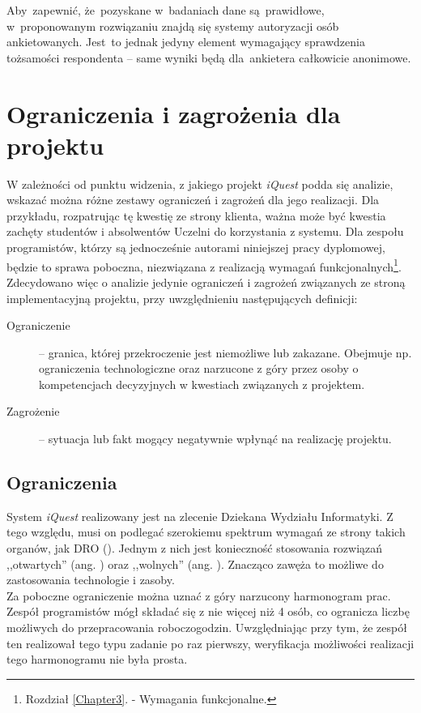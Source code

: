 Aby~zapewnić, że~pozyskane w~badaniach dane są~prawidłowe, w~proponowanym rozwiązaniu znajdą się systemy autoryzacji osób ankietowanych. Jest~to jednak jedyny element wymagający sprawdzenia tożsamości respondenta -- same wyniki będą dla~ankietera całkowicie anonimowe.

\section{Ograniczenia i zagrożenia dla projektu}
\label{Chapter12}

W zależności od punktu widzenia, z jakiego projekt \textit{iQuest} podda się analizie, wskazać można różne zestawy ograniczeń i zagrożeń dla jego realizacji. Dla przykładu, rozpatrując tę kwestię ze strony klienta, ważna może być kwestia zachęty studentów i absolwentów Uczelni do korzystania z systemu. Dla zespołu programistów, którzy są jednocześnie autorami niniejszej pracy dyplomowej, będzie to sprawa poboczna, niezwiązana z realizacją wymagań funkcjonalnych\footnote{Rozdział \ref{Chapter3}. - Wymagania funkcjonalne.}. Zdecydowano więc o analizie jedynie ograniczeń i zagrożeń związanych ze stroną implementacyjną projektu, przy uwzględnieniu następujących definicji:
\begin{description}
\item[Ograniczenie] -- granica, której przekroczenie jest niemożliwe lub zakazane. Obejmuje np. ograniczenia technologiczne oraz narzucone z góry przez osoby o kompetencjach decyzyjnych w kwestiach związanych z projektem.
\item[Zagrożenie] -- sytuacja lub fakt mogący negatywnie wpłynąć na realizację projektu.
\end{description}

\subsection{Ograniczenia}
\label{Chapter121}

System \textit{iQuest} realizowany jest na zlecenie Dziekana Wydziału Informatyki. Z tego względu, musi on podlegać szerokiemu spektrum wymagań ze strony takich organów, jak DRO (). Jednym z nich jest konieczność stosowania rozwiązań ,,otwartych'' (ang. ) oraz ,,wolnych'' (ang. ). Znacząco zawęża to możliwe do zastosowania technologie i zasoby. \\

Za poboczne ograniczenie można uznać z góry narzucony harmonogram prac. Zespół programistów mógł składać się z nie więcej niż 4 osób, co ogranicza liczbę możliwych do przepracowania roboczogodzin. Uwzględniając przy tym, że zespół ten realizował tego typu zadanie po raz pierwszy, weryfikacja możliwości realizacji tego harmonogramu nie była prosta.

